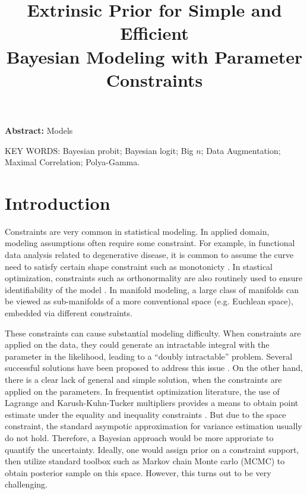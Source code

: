 \documentclass[10pt]{article}
\title{\textbf{Extrinsic Prior for Simple and Efficient\\ Bayesian Modeling with Parameter Constraints}}
\date{}
\begin{document}
\maketitle


{\bf Abstract:} Models
\vskip 12pt

{\noindent  KEY WORDS:  Bayesian probit; Bayesian logit; Big $n$; Data Augmentation; Maximal Correlation; Polya-Gamma.}
{}

\section{Introduction}

Constraints are very common in statistical modeling. In applied domain, modeling assumptions often require some constraint. For example, in functional data analysis related to degenerative disease, it is common to assume the curve need to satisfy certain shape constraint such as monotonicty \citep{lin2014monogp}. In stastical optimization, constraints such as orthonormality are also routinely used to ensure identifiability of the model \citep{uschmajew2010well}. In manifold modeling, a large class of manifolds can be viewed as sub-manifolds of a more conventional space (e.g. Euchlean space), embedded via different constraints.

These constraints can cause substantial modeling difficulty. When constraints are applied on the data, they could generate an intractable integral with the parameter in the likelihood, leading to a ``doubly intractable'' problem. Several successful solutions have been proposed to address this issue \citep{murray2012mcmc,rao2016data}.
On the other hand, there is a clear lack of general and simple solution, when the constraints are applied on the parameters. In frequentist optimization literature, the use of Lagrange and Karush-Kuhn-Tucker multipliers provides a means to obtain point estimate under the equality and inequality constraints \citep{boyd2004convex}. But due to the space constraint, the standard asympotic approximation for variance estimation usually do not hold. Therefore, a Bayesian approach would be more approriate to quantify the uncertainty. Ideally, one would assign prior on a constraint support, then utilize standard toolbox such as Markov chain Monte carlo (MCMC) to obtain posterior sample on this space. However, this turns out to be very challenging.
\end{document}
